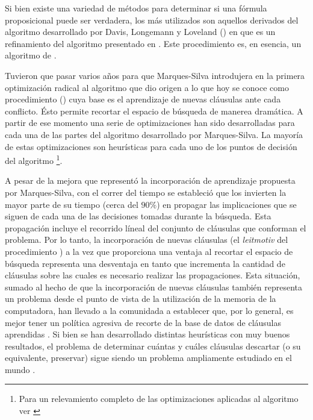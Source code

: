 Si bien existe una variedad de métodos para determinar si una fórmula
proposicional puede ser verdadera, los más utilizados son aquellos derivados del
algoritmo desarrollado por Davis, Longemann y Loveland (\dpll) en
\cite{Davis:1962:MPT:368273.368557} que es un refinamiento del algoritmo
presentado en \cite{Davis:1960:CPQ:321033.321034}. Este procedimiento es, en
esencia, un algoritmo de \bt.

Tuvieron que pasar varios años para que Marques-Silva introdujera en \cite
{marques-silva:iccad96} la primera optimización radical al algoritmo \dpll que
dio origen a lo que hoy se conoce como procedimiento \cdcl (\CDCL) cuya base
es el aprendizaje de nuevas cláusulas ante cada conflicto. Ésto permite
recortar el espacio de búsqueda de manerea dramática. A partir de ese momento
una serie de optimizaciones han sido desarrolladas para cada una de las partes
del algoritmo desarrollado por Marques-Silva. La mayoría de estas
optimizaciones  son heurísticas para cada uno de los
puntos de decisión del algoritmo \footnote{Para un relevamiento completo de
las optimizaciones aplicadas al algoritmo \CDCL ver \cite{manthey:mathesis}}.

A pesar de la mejora que representó la incorporación de aprendizaje propuesta
por Marques-Silva, con el correr del tiempo se estableció que los \ssolvers
invierten la mayor parte de su tiempo (cerca del $90\%$) en propagar las
implicaciones que se siguen de cada una de las decisiones tomadas durante la
búsqueda. Esta propagación incluye el recorrido líneal  del conjunto de cláusulas que conforman el problema. Por lo tanto,
la incorporación de nuevas cláusulas (el \emph{leitmotiv} del procedimiento
\CDCL) a la vez que proporciona una ventaja al recortar el espacio de búsqueda
representa una desventaja en tanto que incrementa la cantidad de cláusulas
sobre las cuales es necesario realizar las propagaciones. Esta situación,
sumado al hecho de que la incorporación de nuevas cláusulas también representa
un problema desde el punto de vista de la utilización de la memoria de la
computadora, han llevado a la comunidada a establecer que, por lo general, es
mejor tener un política agresiva de recorte de la base de datos de cláusulas
aprendidas \cite{Audemard:2009:PLC:1661445.1661509}. Si bien se han
desarrollado distintas heurísticas con muy buenos resultados, el problema de
determinar cuántas y cuáles cláusulas descartar (o su equivalente, preservar)
sigue siendo un problema ampliamente estudiado en el mundo \sat.

